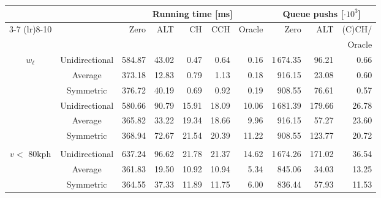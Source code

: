 \begin{tabular}{ccrrrrrrrr}
\toprule
 &  & \multicolumn{5}{c}{Running time [ms]} & \multicolumn{3}{c}{Queue pushs [$\cdot 10^3$]} \\ \cmidrule(lr){3-7} \cmidrule(lr){8-10}\multirow{2}{*}{$w_q$} & & \multirow{2}{*}{Zero} & \multirow{2}{*}{ALT} & \multirow{2}{*}{CH} & \multirow{2}{*}{CCH} & \multirow{2}{*}{Oracle} & \multirow{2}{*}{Zero} & \multirow{2}{*}{ALT} & (C)CH/ \\
 & & & & & & & & & Oracle \\
\midrule
\multirow{3}{*}{$w_{\ell}$} & Unidirectional &            584.87 & 43.02 &  0.47 &  0.64 &   0.16 &                    1\,674.35 &  96.21 &         0.66 \\
        & Average &            373.18 & 12.83 &  0.79 &  1.13 &   0.18 &                     916.15 &  23.08 &         0.60 \\
        & Symmetric &            376.72 & 40.19 &  0.69 &  0.92 &   0.19 &                     908.55 &  76.61 &         0.57 \\
\addlinespace
\multirow{3}{*}{$w_{\ell} \cdot 1.05$} & Unidirectional &            580.66 & 90.79 & 15.91 & 18.09 &  10.06 &                    1\,681.39 & 179.66 &        26.78 \\
        & Average &            365.82 & 33.22 & 19.34 & 18.66 &   9.96 &                     916.15 &  57.27 &        23.60 \\
        & Symmetric &            368.94 & 72.67 & 21.54 & 20.39 &  11.22 &                     908.55 & 123.77 &        20.72 \\
\addlinespace
\multirow{3}{*}{\shortstack{$w_{\ell} \cdot 1.5$ if\\ $v <$ 80kph}} & Unidirectional &            637.24 & 96.62 & 21.78 & 21.37 &  14.62 &                    1\,674.26 & 171.02 &        36.54 \\
        & Average &            361.83 & 19.50 & 10.92 & 10.94 &   5.34 &                     845.06 &  34.03 &        13.25 \\
        & Symmetric &            364.55 & 37.33 & 11.89 & 11.75 &   6.00 &                     836.44 &  57.93 &        11.53 \\
\bottomrule
\end{tabular}

